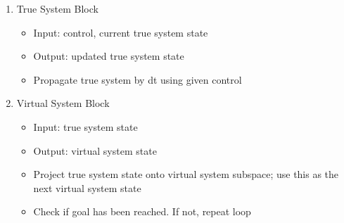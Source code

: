 \begin{enumerate}
\begin{itemize}
\end{itemize}
\item True System Block
\begin{itemize}
	\item Input: control, current true system state
	\item Output: updated true system state
	\item Propagate true system by dt using given control
\end{itemize}
\item Virtual System Block
\begin{itemize}
	\item Input: true system state
	\item Output: virtual system state
	\item Project true system state onto virtual system subspace; use this as the next virtual system state
	\item Check if goal has been reached.  If not, repeat loop
\end{itemize}
\end{enumerate}